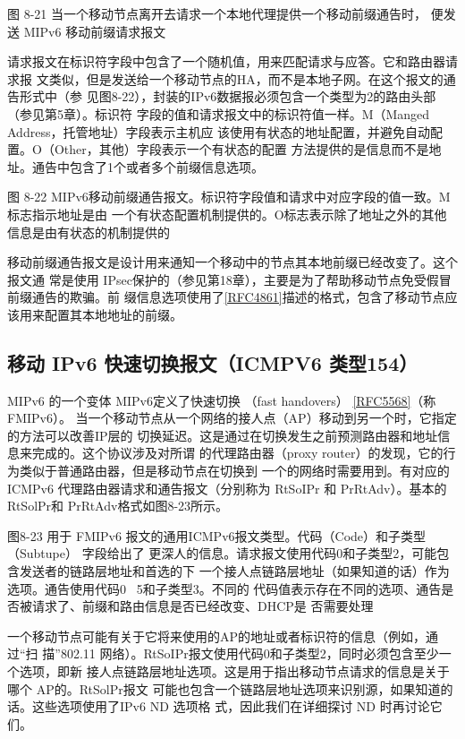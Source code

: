 图 8-21 当一个移动节点离开去请求一个本地代理提供一个移动前缀通告时，
便发送 MIPv6 移动前缀请求报文

请求报文在标识符字段中包含了一个随机值，用来匹配请求与应答。它和路由器请求报
文类似，但是发送给一个移动节点的HA，而不是本地子网。在这个报文的通告形式中（参
见图8-22），封装的IPv6数据报必须包含一个类型为2的路由头部（参见第5章）。标识符
字段的值和请求报文中的标识符值一样。M（Manged Address，托管地址）字段表示主机应
该使用有状态的地址配置，并避免自动配置。O（Other，其他）字段表示一个有状态的配置
方法提供的是信息而不是地址。通告中包含了1个或者多个前缀信息选项。

图 8-22 MIPv6移动前缀通告报文。标识符字段值和请求中对应字段的值一致。M标志指示地址是由
一个有状态配置机制提供的。O标志表示除了地址之外的其他信息是由有状态的机制提供的

移动前缀通告报文是设计用来通知一个移动中的节点其本地前缀已经改变了。这个报文通
常是使用 IPsec保护的（参见第18章），主要是为了帮助移动节点免受假冒前缀通告的欺骗。前
缀信息选项使用了\href{https://www.rfc-editor.org/rfc/rfc4861}{[RFC4861]}描述的格式，包含了移动节点应该用来配置其本地地址的前缀。
\subsection{移动 IPv6 快速切换报文（ICMPV6 类型154）}
MIPv6 的一个变体 MIPv6定义了快速切换 （fast handovers）
\href{https://www.rfc-editor.org/rfc/rfc5568}{[RFC5568]}（称 FMIPv6）。
当一个移动节点从一个网络的接人点（AP）移动到另一个时，它指定的方法可以改善IP层的
切换延迟。这是通过在切换发生之前预测路由器和地址信息来完成的。这个协议涉及对所谓
的代理路由器（proxy router）的发现，它的行为类似于普通路由器，但是移动节点在切换到
一个的网络时需要用到。有对应的ICMPv6 代理路由器请求和通告报文（分别称为 RtSoIPr
和 PrRtAdv）。基本的RtSolPr和 PrRtAdv格式如图8-23所示。

图8-23 用于 FMIPv6 报文的通用ICMPv6报文类型。代码（Code）和子类型（Subtupe） 字段给出了
更深人的信息。请求报文使用代码0和子类型2，可能包含发送者的链路层地址和首选的下
一个接人点链路层地址（如果知道的话）作为选项。通告使用代码0~ 5和子类型3。不同的
代码值表示存在不同的选项、通告是否被请求了、前缀和路由信息是否已经改变、DHCP是
否需要处理

一个移动节点可能有关于它将来使用的AP的地址或者标识符的信息（例如，通过“扫
描”802.11 网络）。RtSoIPr报文使用代码0和子类型2，同时必须包含至少一个选项，即新
接人点链路层地址选项。这是用于指出移动节点请求的信息是关于哪个 AP的。RtSolPr报文
可能也包含一个链路层地址选项来识别源，如果知道的话。这些选项使用了IPv6 ND 选项格
式，因此我们在详细探讨 ND 时再讨论它们。

